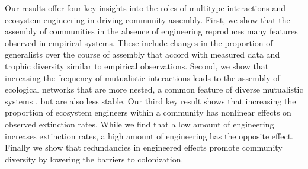 \documentclass[twocolumn,preprintnumbers,amsmath,amssymb,superscriptaddress,linenumbers]{revtex4-1}
\begin{document}
Our results offer four key insights into the roles of multitype interactions and ecosystem engineering in driving community assembly.
First, we show that the assembly of communities in the absence of engineering reproduces many features observed in empirical systems.
These include changes in the proportion of generalists over the course of assembly that accord with measured data and trophic diversity similar to empirical observations. %
Second, we show that increasing the frequency of mutualistic interactions leads to the assembly of ecological networks that are more nested, a common feature of diverse mutualistic systems \cite{Bascompte2003}, but are also less stable.
Our third key result shows that increasing the proportion of ecosystem engineers within a community has nonlinear effects on observed extinction rates.
While we find that a low amount of engineering increases extinction rates, a high amount of engineering has the opposite effect.
Finally we show that redundancies in engineered effects promote community diversity by lowering the barriers to colonization.\\

\end{document}
